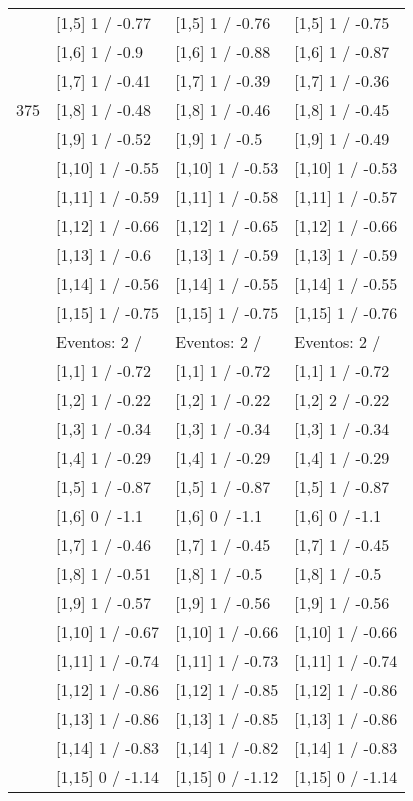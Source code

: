 \begin{table}
\begin{tabular}[t]{llll}
 & {}[1,5] 1  / -0.77 & {}[1,5] 1  / -0.76 & {}[1,5] 1  / -0.75\\
 & {}[1,6] 1  / -0.9 & {}[1,6] 1  / -0.88 & {}[1,6] 1  / -0.87\\
 & {}[1,7] 1  / -0.41 & {}[1,7] 1  / -0.39 & {}[1,7] 1  / -0.36\\
375 & {}[1,8] 1  / -0.48 & {}[1,8] 1  / -0.46 & {}[1,8] 1  / -0.45\\
\addlinespace
 & {}[1,9] 1  / -0.52 & {}[1,9] 1  / -0.5 & {}[1,9] 1  / -0.49\\
 & {}[1,10] 1  / -0.55 & {}[1,10] 1  / -0.53 & {}[1,10] 1  / -0.53\\
 & {}[1,11] 1  / -0.59 & {}[1,11] 1  / -0.58 & {}[1,11] 1  / -0.57\\
 & {}[1,12] 1  / -0.66 & {}[1,12] 1  / -0.65 & {}[1,12] 1  / -0.66\\
 & {}[1,13] 1  / -0.6 & {}[1,13] 1  / -0.59 & {}[1,13] 1  / -0.59\\
\addlinespace
 & {}[1,14] 1  / -0.56 & {}[1,14] 1  / -0.55 & {}[1,14] 1  / -0.55\\
 & {}[1,15] 1  / -0.75 & {}[1,15] 1  / -0.75 & {}[1,15] 1  / -0.76\\
 & Eventos:  2 / & Eventos:  2 / & Eventos:  2 /\\
 & {}[1,1] 1  / -0.72 & {}[1,1] 1  / -0.72 & {}[1,1] 1  / -0.72\\
 & {}[1,2] 1  / -0.22 & {}[1,2] 1  / -0.22 & {}[1,2] 2  / -0.22\\
\addlinespace
 & {}[1,3] 1  / -0.34 & {}[1,3] 1  / -0.34 & {}[1,3] 1  / -0.34\\
 & {}[1,4] 1  / -0.29 & {}[1,4] 1  / -0.29 & {}[1,4] 1  / -0.29\\
 & {}[1,5] 1  / -0.87 & {}[1,5] 1  / -0.87 & {}[1,5] 1  / -0.87\\
 & {}[1,6] 0  / -1.1 & {}[1,6] 0  / -1.1 & {}[1,6] 0  / -1.1\\
 & {}[1,7] 1  / -0.46 & {}[1,7] 1  / -0.45 & {}[1,7] 1  / -0.45\\
\addlinespace
500 & {}[1,8] 1  / -0.51 & {}[1,8] 1  / -0.5 & {}[1,8] 1  / -0.5\\
 & {}[1,9] 1  / -0.57 & {}[1,9] 1  / -0.56 & {}[1,9] 1  / -0.56\\
 & {}[1,10] 1  / -0.67 & {}[1,10] 1  / -0.66 & {}[1,10] 1  / -0.66\\
 & {}[1,11] 1  / -0.74 & {}[1,11] 1  / -0.73 & {}[1,11] 1  / -0.74\\
 & {}[1,12] 1  / -0.86 & {}[1,12] 1  / -0.85 & {}[1,12] 1  / -0.86\\
\addlinespace
 & {}[1,13] 1  / -0.86 & {}[1,13] 1  / -0.85 & {}[1,13] 1  / -0.86\\
 & {}[1,14] 1  / -0.83 & {}[1,14] 1  / -0.82 & {}[1,14] 1  / -0.83\\
 & {}[1,15] 0  / -1.14 & {}[1,15] 0  / -1.12 & {}[1,15] 0  / -1.14\\
\bottomrule
\end{tabular}
\end{table}
